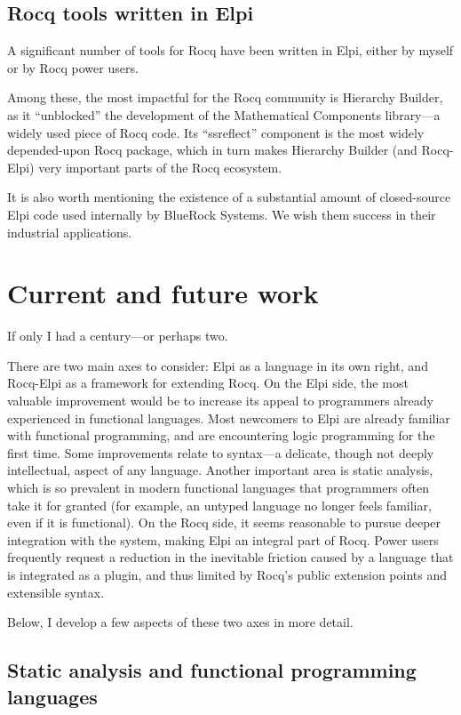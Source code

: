 \documentclass[a4paper, 11pt]{book}
\begin{document}
\subsection{Rocq tools written in Elpi}

A significant number of tools for Rocq have been written in Elpi, either by myself or by Rocq power users.

Among these, the most impactful for the Rocq community is Hierarchy Builder, as it ``unblocked'' the development of the Mathematical Components library—a widely used piece of Rocq code. Its ``ssreflect'' component is the most widely depended-upon Rocq package, which in turn makes Hierarchy Builder (and Rocq-Elpi) very important parts of the Rocq ecosystem.

It is also worth mentioning the existence of a substantial amount of closed-source Elpi code used internally by BlueRock Systems. We wish them success in their industrial applications.

\section{Current and future work}

If only I had a century—or perhaps two. 

There are two main axes to consider:
Elpi as a language in its own right, and Rocq-Elpi as a framework for extending
Rocq. On the Elpi side, the most valuable improvement would be to increase its
appeal to programmers already experienced in functional languages. Most
newcomers to Elpi are already familiar with functional programming, and are
encountering logic programming for the first time. Some improvements relate to
syntax—a delicate, though not deeply intellectual, aspect of any language.
Another important area is static analysis, which is so prevalent in modern
functional languages that programmers often take it for granted (for example,
an untyped language no longer feels familiar, even if it is functional). On the
Rocq side, it seems reasonable to pursue deeper integration with the system,
making Elpi an integral part of Rocq. Power users frequently request a
reduction in the inevitable friction caused by a language that is integrated as
a plugin, and thus limited by Rocq’s public extension points and extensible
syntax.

Below, I develop a few aspects of these two axes in more detail.

\subsection{Static analysis and functional programming languages} 
\end{document}
